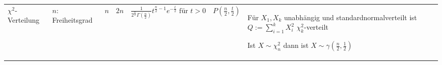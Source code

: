 \documentclass[a4paper,10pt]{article}
\begin{document}
\begin{center}
\begin{tabularx}{\textwidth}{llXXXXXX}
		\( \chi ^2 \)-Verteilung & \( n \): Freiheitsgrad         & \( n \)                                                                 & \( 2n \)                                                                                                    & \( \frac{1}{2^{\frac{n}{2}}\Gamma (\frac{n}{2})} t^{\frac{n}{2}-1} e^{-\frac{t}{2}} \text{ für } t>0\)                                        & \(P\left( \frac{n}{2}, \frac{t}{2}\right)  \)                                          & \begin{rowlist}
			                                                                                                                                                                                                                                                                                                                                                                                                                                                                                             \item Für $X_1, X_k$ unabhängig und standardnormalverteilt ist $Q := \sum_{i=1}^k X_i^2$ $\chi_k^2$-verteilt
			                                                                                                                                                                                                                                                                                                                                                                                                                                                                                             \item Ist $X \sim \chi_n^2$ dann ist $X \sim \gamma(\frac{n}{2}, \frac{1}{2})$
		                                                                                                                                                                                                                                                                                                                                                                                                                                                                                             \end{rowlist} \\


\end{tabularx}
\end{center}
\end{document}
